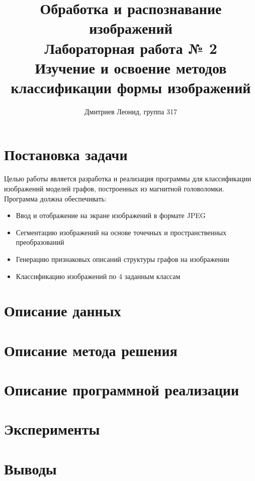 \documentclass[10pt]{article}
\author{Дмитриев Леонид, группа 317}
\title{
	Обработка и распознавание изображений\\
	Лабораторная работа № 2\\
	Изучение и освоение методов классификации формы изображений
}
\begin{document}
	{
		\LARGE
		\maketitle
	}
	
	\clearpage
	
	
	{ \large \tableofcontents} 
	
	\clearpage
	
	
	
	\section*{Постановка задачи}
	
	
	Целью работы является разработка и реализация программы для классификации изображений моделей графов,
	построенных из магнитной головоломки.\\
	Программа должна обеспечивать:
	\begin{itemize}
		\item Ввод и отображение на экране изображений в формате JPEG
		
		\item Сегментацию изображений на основе точечных и пространственных преобразований
		
		\item Генерацию признаковых описаний структуры графов на изображении
		
		\item Классификацию изображений по 4 заданным классам
	\end{itemize}
	
	
	\section*{Описание данных}
	
	
	
	
	\section*{Описание метода решения}
	
	
	
	\section*{Описание программной реализации}
	
	
	
	
	\section*{Эксперименты}
	
	
	
	
	\section*{Выводы}
	
	
	
\end{document}
